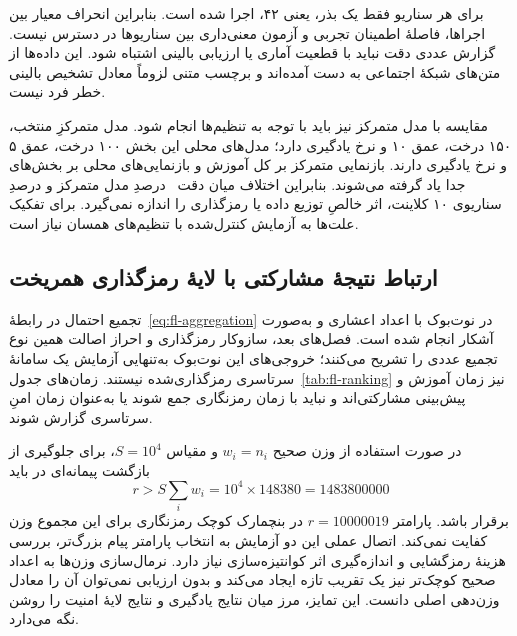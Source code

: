 برای هر سناریو فقط یک بذر، یعنی ۴۲، اجرا شده است. بنابراین انحراف معیار بین اجراها، فاصلۀ اطمینان تجربی و آزمون معنی‌داری بین سناریوها در دسترس نیست. گزارش عددی دقت نباید با قطعیت آماری یا ارزیابی بالینی اشتباه شود. این داده‌ها از متن‌های شبکۀ اجتماعی به دست آمده‌اند و برچسب متنی لزوماً معادل تشخیص بالینی خطر فرد نیست.

مقایسه با مدل متمرکز نیز باید با توجه به تنظیم‌ها انجام شود. مدل متمرکزِ منتخب، ۱۵۰ درخت، عمق ۱۰ و نرخ یادگیری  دارد؛ مدل‌های محلی این بخش ۱۰۰ درخت، عمق ۵ و نرخ یادگیری  دارند. بازنمایی متمرکز بر کل آموزش و بازنمایی‌های محلی بر بخش‌های جدا یاد گرفته می‌شوند. بنابراین اختلاف میان دقت \BestTestAccuracyPercent\ درصدِ مدل متمرکز و  درصدِ سناریوی ۱۰ کلاینت، اثر خالصِ توزیع داده یا رمزگذاری را اندازه نمی‌گیرد. برای تفکیک علت‌ها به آزمایش کنترل‌شده با تنظیم‌های همسان نیاز است.

\subsection{ارتباط نتیجۀ مشارکتی با لایۀ رمزگذاری همریخت}
تجمیع احتمال در رابطۀ~\eqref{eq:fl-aggregation} در نوت‌بوک با اعداد اعشاری و به‌صورت آشکار انجام شده است. فصل‌های بعد، سازوکار رمزگذاری و احراز اصالت همین نوع تجمیع عددی را تشریح می‌کنند؛ خروجی‌های این نوت‌بوک به‌تنهایی آزمایش یک سامانۀ سرتاسری رمزگذاری‌شده نیستند. زمان‌های جدول~\ref{tab:fl-ranking} نیز زمان آموزش و پیش‌بینی مشارکتی‌اند و نباید با زمان رمزنگاری جمع شوند یا به‌عنوان زمان امنِ سرتاسری گزارش شوند.

در صورت استفاده از وزن صحیح $w_i=n_i$ و مقیاس $S=10^4$، برای جلوگیری از بازگشت پیمانه‌ای در  باید
\begin{equation}
r>S\sum_iw_i=10^4\times148380=1483800000
\label{eq:fl-benaloh-capacity}
\end{equation}
برقرار باشد. پارامتر $r=10000019$ در بنچمارک کوچک رمزنگاری برای این مجموع وزن کفایت نمی‌کند. اتصال عملی این دو آزمایش به انتخاب پارامتر پیام بزرگ‌تر، بررسی هزینۀ رمزگشایی و اندازه‌گیری اثر کوانتیزه‌سازی نیاز دارد. نرمال‌سازی وزن‌ها به اعداد صحیح کوچک‌تر نیز یک تقریب تازه ایجاد می‌کند و بدون ارزیابی نمی‌توان آن را معادل وزن‌دهی اصلی دانست. این تمایز، مرز میان نتایج یادگیری و نتایج لایۀ امنیت را روشن نگه می‌دارد.
\FloatBarrier
